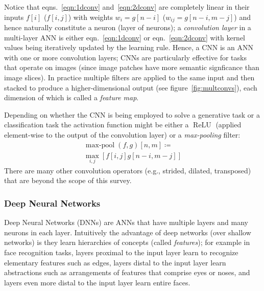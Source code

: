 Notice that eqns.~\eqref{eqn:1dconv} and~\eqref{eqn:2dconv} are completely linear in their inputs \(f[i]\) (\(f[i,j]\)) with weights \(w_i = g[n-i]\) (\(w_{ij} = g[n-i, m-j]\)) and hence naturally constitute a neuron (layer of neurons); a \textit{convolution layer} in a multi-layer ANN is either eqn.~\eqref{eqn:1dconv} or eqn.~\eqref{eqn:2dconv} with kernel values being iteratively updated by the learning rule.
%
Hence, a CNN is an ANN with one or more convolution layers; CNNs are particularly effective for tasks that operate on images (since image patches have more semantic signficance than image slices).
%
In practice multiple filters are applied to the same input and then stacked to produce a higher-dimensional output (see figure~\ref{fig:multconvs}), each dimension of which is called a \textit{feature map}.

%
Depending on whether the CNN is being employed to solve a generative task or a classification task the activation function might be either a \(\operatorname{ReLU}\) (applied element-wise to the output of the convolution layer) or a \textit{max-pooling} filter:
\begin{multline}
    \operatorname{max-pool}(f,g)[n, m]\coloneqq\\ \max_{i,j}\left[ f[i, j]g[n-i, m-j] \right]
    \label{eqn:2dpool}
\end{multline}
There are many other convolution operators (e.g., strided, dilated, transposed) that are beyond the scope of this survey\cite{dumoulin2016guide}.

\subsubsection{Deep Neural Networks}\label{subsubsec:dnns}

%
Deep Neural Networks (DNNs) are ANNs that have multiple layers and many neurons in each layer.
%
Intuitively the advantage of deep networks (over shallow networks) is they learn hierarchies of concepts (called \textit{features}); for example in face recognition tasks, layers proximal to the input layer learn to recognize elementary features such as edges, layers distal to the input layer learn abstractions such as arrangements of features that comprise eyes or noses, and layers even more distal to the input layer learn entire faces.

